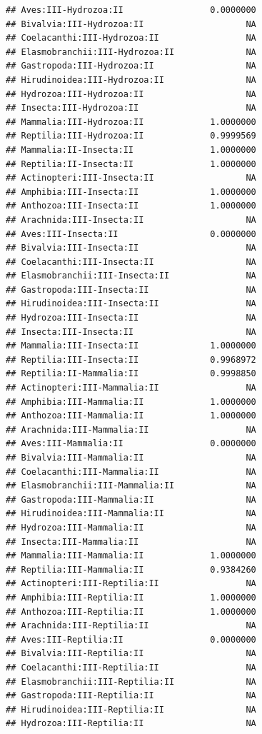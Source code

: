 \documentclass[
  12pt,
]{article}
\begin{document}
\begin{verbatim}
## Aves:III-Hydrozoa:II                 0.0000000
## Bivalvia:III-Hydrozoa:II                    NA
## Coelacanthi:III-Hydrozoa:II                 NA
## Elasmobranchii:III-Hydrozoa:II              NA
## Gastropoda:III-Hydrozoa:II                  NA
## Hirudinoidea:III-Hydrozoa:II                NA
## Hydrozoa:III-Hydrozoa:II                    NA
## Insecta:III-Hydrozoa:II                     NA
## Mammalia:III-Hydrozoa:II             1.0000000
## Reptilia:III-Hydrozoa:II             0.9999569
## Mammalia:II-Insecta:II               1.0000000
## Reptilia:II-Insecta:II               1.0000000
## Actinopteri:III-Insecta:II                  NA
## Amphibia:III-Insecta:II              1.0000000
## Anthozoa:III-Insecta:II              1.0000000
## Arachnida:III-Insecta:II                    NA
## Aves:III-Insecta:II                  0.0000000
## Bivalvia:III-Insecta:II                     NA
## Coelacanthi:III-Insecta:II                  NA
## Elasmobranchii:III-Insecta:II               NA
## Gastropoda:III-Insecta:II                   NA
## Hirudinoidea:III-Insecta:II                 NA
## Hydrozoa:III-Insecta:II                     NA
## Insecta:III-Insecta:II                      NA
## Mammalia:III-Insecta:II              1.0000000
## Reptilia:III-Insecta:II              0.9968972
## Reptilia:II-Mammalia:II              0.9998850
## Actinopteri:III-Mammalia:II                 NA
## Amphibia:III-Mammalia:II             1.0000000
## Anthozoa:III-Mammalia:II             1.0000000
## Arachnida:III-Mammalia:II                   NA
## Aves:III-Mammalia:II                 0.0000000
## Bivalvia:III-Mammalia:II                    NA
## Coelacanthi:III-Mammalia:II                 NA
## Elasmobranchii:III-Mammalia:II              NA
## Gastropoda:III-Mammalia:II                  NA
## Hirudinoidea:III-Mammalia:II                NA
## Hydrozoa:III-Mammalia:II                    NA
## Insecta:III-Mammalia:II                     NA
## Mammalia:III-Mammalia:II             1.0000000
## Reptilia:III-Mammalia:II             0.9384260
## Actinopteri:III-Reptilia:II                 NA
## Amphibia:III-Reptilia:II             1.0000000
## Anthozoa:III-Reptilia:II             1.0000000
## Arachnida:III-Reptilia:II                   NA
## Aves:III-Reptilia:II                 0.0000000
## Bivalvia:III-Reptilia:II                    NA
## Coelacanthi:III-Reptilia:II                 NA
## Elasmobranchii:III-Reptilia:II              NA
## Gastropoda:III-Reptilia:II                  NA
## Hirudinoidea:III-Reptilia:II                NA
## Hydrozoa:III-Reptilia:II                    NA

\end{verbatim}
\end{document}
